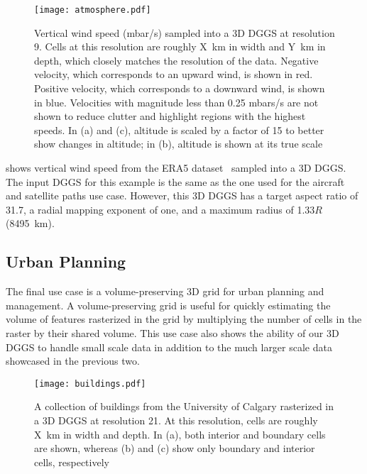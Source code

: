 \begin{figure}[ht!]
	\centering
	\texttt{[image: atmosphere.pdf]}
	\caption[Atmospheric properties resampling use case showing vertical wind speed]{
		Vertical wind speed (mbar/s) sampled into a 3D DGGS at resolution 9.
		Cells at this resolution are roughly X~km in width and Y~km in depth, which closely matches the resolution of the data.
		Negative velocity, which corresponds to an upward wind, is shown in red.
		Positive velocity, which corresponds to a downward wind, is shown in blue.
		Velocities with magnitude less than 0.25 mbars/s are not shown to reduce clutter and highlight regions with the highest speeds.
		In (a) and (c), altitude is scaled by a factor of 15 to better show changes in altitude; in (b), altitude is shown at its true scale
	}
	\label{fig:atmosphere}
\end{figure}


 shows vertical wind speed from the ERA5 dataset~\cite{era5} sampled into a 3D DGGS.
The input DGGS for this example is the same as the one used for the aircraft and satellite paths use case.
However, this 3D DGGS has a target aspect ratio of 31.7, a radial mapping exponent of one, and a maximum radius of 1.33$R$ (8495~km).


\subsection{Urban Planning}
The final use case is a volume-preserving 3D grid for urban planning and management.
A volume-preserving grid is useful for quickly estimating the volume of features rasterized in the grid by multiplying the number of cells in the raster by their shared volume.
This use case also shows the ability of our 3D DGGS to handle small scale data in addition to the much larger scale data showcased in the previous two.


\begin{figure}[ht!]
	\centering
	\texttt{[image: buildings.pdf]}
	\caption[Urban planning use case showing various rasterized buildings]{
		A collection of buildings from the University of Calgary rasterized in a 3D DGGS at resolution 21.
		At this resolution, cells are roughly X~km in width and depth.
		In (a), both interior and boundary cells are shown, whereas (b) and (c) show only boundary and interior cells, respectively
	}
	\label{fig:urbanplanning}
\end{figure}


